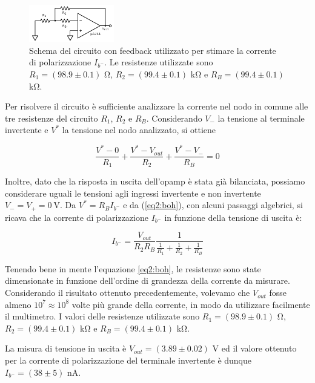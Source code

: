 \begin{figure}
  \begin{center}
    \includegraphics[width=0.330\textwidth]{../E02/latex/inv_current.pdf}
  \end{center}
  \caption{Schema del circuito con feedback utilizzato per stimare la corrente di polarizzazione $I_{b^-}$. Le resistenze utilizzate sono $R_1=(98.9\pm0.1)$ \si{\ohm}, $R_2=(99.4\pm0.1)$ \si{\kilo\ohm} e $R_B=(99.4\pm0.1)$ \si{\kilo\ohm}.}
  \label{cir2:correnti_retroazione_inv}
\end{figure}

Per risolvere il circuito è sufficiente analizzare la corrente nel nodo in comune alle tre resistenze del circuito $R_1$, $R_2$ e $R_B$.
Considerando $V_-$ la tensione al terminale invertente e $V^*$ la tensione nel nodo analizzato, si ottiene

\begin{equation}
\frac{V^* - 0}{R_1} + \frac{V^*-V_{out}}{R_2} + \frac{V^*-V_{-}}{R_B}=0
\label{eq2:boh}
\end{equation}

Inoltre, dato che la risposta in uscita dell'opamp è stata già bilanciata, possiamo considerare uguali le tensioni agli ingressi invertente e non invertente $V_- = V_+ = \SI{0}{\volt}$.
Da $V^* = R_B I_{b^-}$ e da (\ref{eq2:boh}), con alcuni passaggi algebrici, si ricava che la corrente di polarizzazione $I_{b^-}$ in funzione della tensione di uscita è:

\begin{equation}
I_{b^-}=\frac{V_{out}}{R_2 R_B}\frac{1}{\frac{1}{R_1}+\frac{1}{R_2}+\frac{1}{R_B}}
\label{eq2:boh2}
\end{equation}

Tenendo bene in mente l'equazione \ref{eq2:boh}, le resistenze sono state dimensionate in funzione dell'ordine di grandezza della corrente da misurare.
Considerando il risultato ottenuto precedentemente, volevamo che $V_{out}$ fosse almeno $10^7\approx10^8$ volte più grande della corrente, in modo da utilizzare facilmente il multimetro.
I valori delle resistenze utilizzate sono $R_1=(98.9\pm0.1)$ \si{\ohm}, $R_2=(99.4\pm0.1)$ \si{\kilo\ohm} e $R_B=(99.4\pm0.1)$ \si{\kilo\ohm}.

La misura di tensione in uscita è $V_{out} = (3.89\pm0.02)$ \si{\volt} ed il valore ottenuto per la corrente di polarizzazione del terminale invertente è dunque $I_{b^-} = (38 \pm 5)$ \si{\nano\ampere}.

